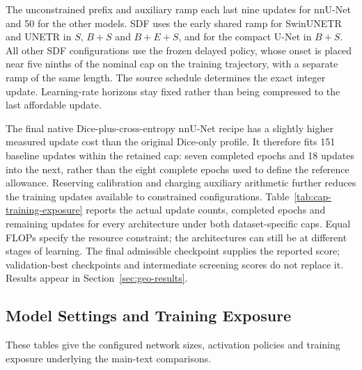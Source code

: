 \documentclass[12pt,a4paper]{article}
\begin{document}
The unconstrained prefix and auxiliary ramp each last nine updates
for nnU-Net and 50 for the other models. SDF uses the early shared
ramp for SwinUNETR and UNETR in $S$, $B+S$ and $B+E+S$, and for
the compact U-Net in $B+S$. All other SDF configurations use the
frozen delayed policy, whose onset is placed near five ninths of the
nominal cap on the training trajectory, with a separate ramp of the
same length. The source schedule determines the exact integer update.
Learning-rate horizons stay fixed rather than being compressed to the
last affordable update.

The final native Dice-plus-cross-entropy nnU-Net recipe has a slightly
higher measured update cost than the original Dice-only profile. It
therefore fits 151 baseline updates within the retained cap: seven
completed epochs and 18 updates into the next, rather than the eight
complete epochs used to define the reference allowance. Reserving
calibration and charging auxiliary arithmetic further reduces the
training updates available to constrained configurations.
Table~\ref{tab:cap-training-exposure} reports the actual update counts,
completed epochs and remaining updates for every architecture under
both dataset-specific caps. Equal FLOPs specify the resource constraint;
the architectures can still be at different stages of learning.
The final admissible checkpoint supplies the reported score;
validation-best checkpoints and intermediate screening scores do not
replace it. Results appear in Section~\ref{sec:geo-results}.

\subsection{Model Settings and Training Exposure}\label{sec:implementation-tables}
These tables give the configured network sizes, activation policies and
training exposure underlying the main-text comparisons.
\end{document}
